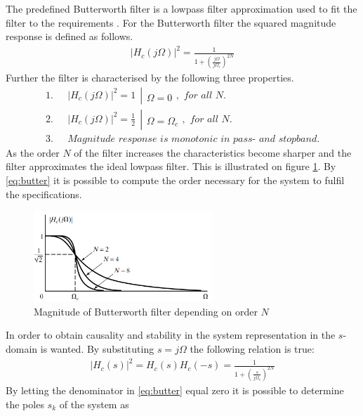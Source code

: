 The predefined Butterworth filter is a lowpass filter approximation used to fit the filter to the requirements . For the Butterworth filter the squared magnitude response is defined as follows.
\begin{align}\label{eq:butter}
|H_c(j\Omega)|^2=\frac{1}{1+\left( \frac{j\Omega}{j\Omega_c}\right)^{2N}}
\end{align} 
Further the filter is characterised by the following three properties.
\begin{align}
1.& \ \ \ |H_c(j\Omega)|^2 = 1 \  \ \left|\begin{matrix}
\\ 
\Omega=0
\end{matrix}\right. , \textit{ for all }N. \\
2.& \ \ \ |H_c(j\Omega)|^2 = \frac{1}{2} \  \ \left|\begin{matrix}
\\ 
\Omega=\Omega_c
\end{matrix}\right. , \textit{ for all }N. \\
3.& \ \ \ \textit{Magnitude response is monotonic in pass- and stopband.}
\end{align}
As the order $N$ of the filter increases the characteristics become sharper and the filter approximates the ideal lowpass filter. This is illustrated on figure \ref{fig:butter}. By \eqref{eq:butter} it is possible to compute the order necessary for the system to fulfil the specifications.            
\begin{figure}[H]
    \centering
    \includegraphics[width = 0.6\textwidth]{figures/butterworth.png}
    \caption{Magnitude of Butterworth filter depending on order $N$ }
    \label{fig:butter}
\end{figure} 
In order to obtain causality and stability in the system representation in the $s$-domain is wanted. By substituting $s=j\Omega$ the following relation is true:
\begin{align}
|H_c(s)|^2 = H_c(s)H_c(-s)= \frac{1}{1+\left( \frac{s}{j\Omega_c}\right)^{2N}}
\end{align} 
By letting the denominator in \eqref{eq:butter} equal zero it is possible to determine the poles $s_k$ of the system as 
